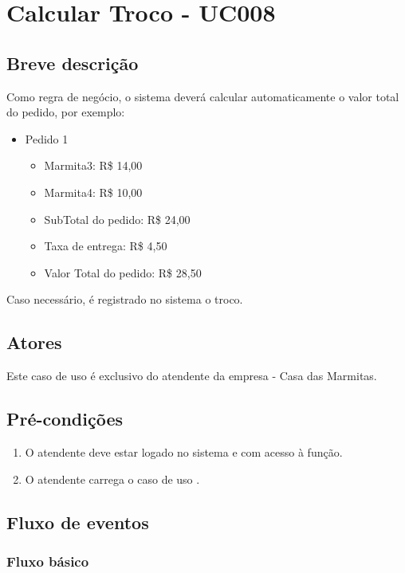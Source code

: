 \chapter{Calcular Troco - UC008} \label{uc008}

\section{Breve descrição}

Como regra de negócio, o sistema deverá calcular automaticamente o valor total do pedido, por exemplo:

\begin{itemize}
	\item Pedido 1
	\begin{itemize}
		\item Marmita3: R\$ 14,00
		\item Marmita4: R\$ 10,00
		\item SubTotal do pedido: R\$ 24,00
		\item Taxa de entrega: R\$ 4,50
		\item Valor Total do pedido: R\$ 28,50
	\end{itemize}
\end{itemize}

Caso necessário, é registrado no sistema o troco.

\section{Atores}

Este caso de uso é exclusivo do atendente da empresa - Casa das Marmitas.

\section{Pré-condições}

\begin{enumerate}
	\item O atendente deve estar logado no sistema e com acesso à função.
	\item O atendente carrega o caso de uso .
\end{enumerate}

\section{Fluxo de eventos}

\subsection{Fluxo básico}

